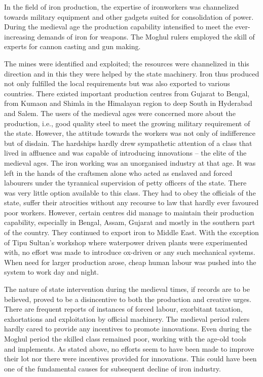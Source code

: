 In the field of iron production, the expertise of ironworkers was channelized towards military equipment and other gadgets suited for consolidation of power. During the medieval age the production capability intensified to meet the ever-increasing demands of iron for weapons. The Moghul rulers employed the skill of experts for cannon casting and gun making.

The mines were identified and exploited; the resources were channelized in this direction and in this they were helped by the state machinery. Iron thus produced not only fulfilled the local requirements but was also exported to various countries. There existed important production centres from Gujarat to Bengal, from Kumaon and Shimla in the Himalayan region to deep South in Hyderabad and Salem. The users of the medieval ages were concerned more about the production, i.e., good quality steel to meet the growing military requirement of the state. However, the attitude towards the workers was not only of indifference but of disdain. The hardships hardly drew sympathetic attention of a class that lived in affluence and was capable of introducing innovations – the elite of the medieval ages. The iron working was an unorganised industry at that age. It was left in the hands of the craftsmen alone who acted as enslaved and forced labourers under the tyrannical supervision of petty officers of the state. There was very little option available to this class. They had to obey the officials of the state, suffer their atrocities without any recourse to law that hardly ever favoured poor workers. However, certain centres did manage to maintain their production capability, especially in Bengal, Assam, Gujarat and mostly in the southern part of the country. They continued to export iron to Middle East. With the exception of Tipu Sultan's workshop where waterpower driven plants were experimented with, no effort was made to introduce ox-driven or any such mechanical systems. When need for larger production arose, cheap human labour was pushed into the system to work day and night. 

The nature of state intervention during the medieval times, if records are to be believed, proved to be a disincentive to both the production and creative urges. There are frequent reports of instances of forced labour, exorbitant taxation, exhortations and exploitation by official machinery. The medieval period rulers hardly cared to provide any incentives to promote innovations. Even during the Moghul period the skilled class remained poor, working with the age-old tools and implements. As stated above, no efforts seem to have been made to improve their lot nor there were incentives provided for innovations. This could have been one of the fundamental causes for subsequent decline of iron industry.

